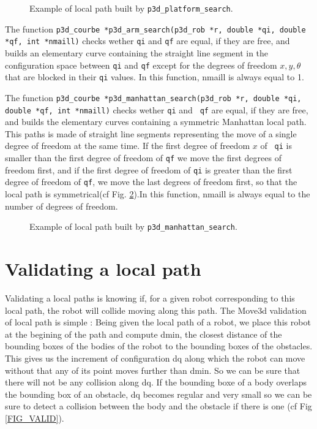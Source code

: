 \begin{figure}[hbt]
\centerline{
}
\caption{\small 
Example of local path built by {\tt p3d\_platform\_search}.
}
\label{FIG_LOCAL_RS}
\end{figure}  

The function {\tt p3d\_courbe *p3d\_arm\_search(p3d\_rob *r, double
*qi, double *qf, int *nmaill)}  checks wether
{\tt qi} and {\tt qf} are equal, if they are free, and builds an
elementary curve containing the straight line segment in the
configuration space between {\tt qi} and {\tt qf} except for the
degrees of freedom $x,y,\theta$ that are blocked in their {\tt qi}
values. In this function, nmaill is always equal to 1.

The function {\tt p3d\_courbe *p3d\_manhattan\_search(p3d\_rob *r,
double *qi, double *qf, int *nmaill)} 
checks wether {\tt qi} and {\tt
qf} are equal, if they are free, and builds the elementary curves
containing a symmetric Manhattan local path. This paths is made of
straight line segments representing the move of a single degree of
freedom at the same time. If the first degree of freedom $x$ of {\tt
qi} is smaller than the first degree of freedom of {\tt qf} we move
the first degrees of freedom first, and if the first degree of freedom
of {\tt qi} is greater than the first degree of freedom of {\tt qf},
we move the last degrees of freedom first, so that the local path is
symmetrical(cf Fig. \ref{FIG_LOCAL_MAN}).In this function, nmaill is always
equal to the number of degrees of freedom.

\begin{figure}[hbt]
\centerline{
}
\caption{\small 
Example of local path built by {\tt p3d\_manhattan\_search}.
}
\label{FIG_LOCAL_MAN}
\end{figure}

\section{Validating a local path}

Validating a local paths is knowing if, for a given robot
corresponding to this local path, the robot will collide moving along
this path. The Move3d validation of local path is simple : Being given
the local path of a robot, we place this robot at the begining of the
path and compute dmin, the closest distance of the bounding boxes of
the bodies of the robot to the bounding boxes of the obstacles. This
gives us the increment of configuration dq along which the robot can
move without that any of its point moves further than dmin. So we can
be sure that there will not be any collision along dq. If the bounding
boxe of a body overlaps the bounding box of an obstacle, dq becomes
regular and very small so we can be sure to detect a collision between
the body and the obstacle if there is one (cf Fig \ref{FIG_VALID}).


